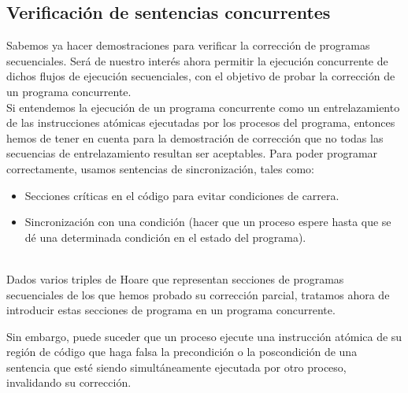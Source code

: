 \subsection{Verificación de sentencias concurrentes}
Sabemos ya hacer demostraciones para verificar la corrección de programas secuenciales. Será de nuestro interés ahora permitir la ejecución concurrente de dichos flujos de ejecución secuenciales, con el objetivo de probar la corrección de un programa concurrente.\\

Si entendemos la ejecución de un programa concurrente como un entrelazamiento de las instrucciones atómicas ejecutadas por los procesos del programa, entonces hemos de tener en cuenta para la demostración de corrección que no todas las secuencias de entrelazamiento resultan ser aceptables. Para poder programar correctamente, usamos sentencias de sincronización, tales como:
\begin{itemize}
    \item Secciones críticas en el código para evitar condiciones de carrera.
    \item Sincronización con una condición (hacer que un proceso espere hasta que se dé una determinada condición en el estado del programa).
\end{itemize}~\\

Dados varios triples de Hoare que representan secciones de programas secuenciales de los que hemos probado su corrección parcial, tratamos ahora de introducir estas secciones de programa en un programa concurrente.

Sin embargo, puede suceder que un proceso ejecute una instrucción atómica de su región de código que haga falsa la precondición o la poscondición de una sentencia que esté siendo simultáneamente ejecutada por otro proceso, invalidando su corrección.

